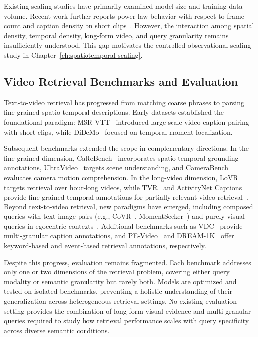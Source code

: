 Existing scaling studies have primarily examined model size and training data volume. Recent work further reports power-law behavior with respect to frame count and caption density on short clips~\citep{zhu2025dynamic}. However, the interaction among spatial density, temporal density, long-form video, and query granularity remains insufficiently understood. This gap motivates the controlled observational-scaling study in Chapter~\ref{ch:spatiotemporal-scaling}.

\subsection{Video Retrieval Benchmarks and Evaluation}
\label{sec:lr-benchmarks}

Text-to-video retrieval has progressed from matching coarse phrases to parsing fine-grained spatio-temporal descriptions. Early datasets established the foundational paradigm: MSR-VTT~\citep{xu2016msr} introduced large-scale video-caption pairing with short clips, while DiDeMo~\citep{anne2017localizing} focused on temporal moment localization.

Subsequent benchmarks extended the scope in complementary directions. In the fine-grained dimension, CaReBench~\citep{xu2025carebench} incorporates spatio-temporal grounding annotations, UltraVideo~\citep{ultravideo} targets scene understanding, and CameraBench~\citep{lin2025towards} evaluates camera motion comprehension. In the long-video dimension, LoVR~\citep{cai2025lovr} targets retrieval over hour-long videos, while TVR~\citep{lei2020tvr} and ActivityNet Captions~\citep{krishna2017dense} provide fine-grained temporal annotations for partially relevant video retrieval~\citep{dong2022partially}. Beyond text-to-video retrieval, new paradigms have emerged, including composed queries with text-image pairs (e.g., CoVR~\citep{ventura2024covr,hummel2024egocvr}, MomentSeeker~\citep{yuan2025momentseeker}) and purely visual queries in egocentric contexts~\citep{liu2021activity}. Additional benchmarks such as VDC~\citep{chai2024auroracap} provide multi-granular caption annotations, and PE-Video~\citep{bolya2025perception} and DREAM-1K~\citep{wang2024tarsier} offer keyword-based and event-based retrieval annotations, respectively.

Despite this progress, evaluation remains fragmented. Each benchmark addresses only one or two dimensions of the retrieval problem, covering either query modality or semantic granularity but rarely both. Models are optimized and tested on isolated benchmarks, preventing a holistic understanding of their generalization across heterogeneous retrieval settings. No existing evaluation setting provides the combination of long-form visual evidence and multi-granular queries required to study how retrieval performance scales with query specificity across diverse semantic conditions.

